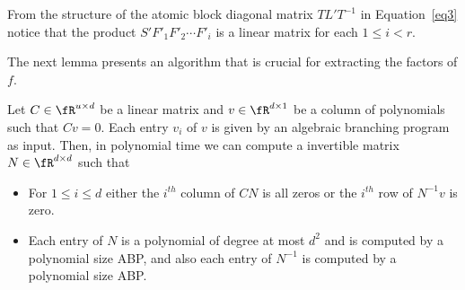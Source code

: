 {From} the structure of the atomic block diagonal matrix $TL'T^{-1}$
in Equation~\ref{eq3} notice that the product $S'F'_1F'_2\cdots F'_i $
is a linear matrix for each $1\le i<r$.

The next lemma presents an algorithm that is crucial for extracting
the factors of $f$.

\begin{lemma}\label{triv-lem}
  Let $C\in\fR^{u\times d}$ be a linear matrix and $v\in\fR^{d\times
    1}$ be a column of polynomials such that $Cv=0$. Each entry $v_i$ of $v$ is given by an
  algebraic branching program as input. Then, in polynomial time we
  can compute a invertible matrix $N\in\fR^{d\times d}$ such that
  \begin{itemize}
  \item For $1\le i\le d$ either the $i^{th}$ column of $CN$ is all zeros
    or the $i^{th}$ row of $N^{-1}v$ is zero.
  \item Each entry of $N$ is a polynomial of degree at most $d^2$ and
    is computed by a polynomial size ABP, and also each entry of
    $N^{-1}$ is computed by a polynomial size ABP.
  \end{itemize}
%
\end{lemma}

